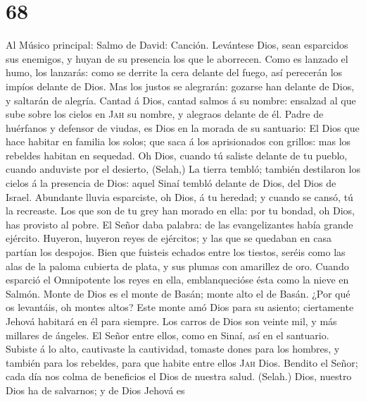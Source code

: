 \hypertarget{section-67}{%
\section{68}\label{section-67}}

 Al Músico principal: Salmo de David: Canción. Levántese
Dios, sean esparcidos sus enemigos, y huyan de su presencia los que le
aborrecen.  Como es lanzado el humo, los lanzarás: como se
derrite la cera delante del fuego, así perecerán los impíos delante de
Dios.  Mas los justos se alegrarán: gozarse han delante de
Dios, y saltarán de alegría.  Cantad á Dios, cantad salmos
á su nombre: ensalzad al que sube sobre los cielos en \textsc{Jah} su
nombre, y alegraos delante de él.  Padre de huérfanos y
defensor de viudas, es Dios en la morada de su santuario: 
El Dios que hace habitar en familia los solos; que saca á los
aprisionados con grillos: mas los rebeldes habitan en sequedad.
 Oh Dios, cuando tú saliste delante de tu pueblo, cuando
anduviste por el desierto, (Selah,)  La tierra tembló;
también destilaron los cielos á la presencia de Dios: aquel Sinaí tembló
delante de Dios, del Dios de Israel.  Abundante lluvia
esparciste, oh Dios, á tu heredad; y cuando se cansó, tú la recreaste.
 Los que son de tu grey han morado en ella: por tu
bondad, oh Dios, has provisto al pobre.  El Señor daba
palabra: de las evangelizantes había grande ejército. 
Huyeron, huyeron reyes de ejércitos; y las que se quedaban en casa
partían los despojos.  Bien que fuisteis echados entre
los tiestos, seréis como las alas de la paloma cubierta de plata, y sus
plumas con amarillez de oro.  Cuando esparció el
Omnipotente los reyes en ella, emblanquecióse ésta como la nieve en
Salmón.  Monte de Dios es el monte de Basán; monte alto
el de Basán.  ¿Por qué os levantáis, oh montes altos?
Este monte amó Dios para su asiento; ciertamente Jehová habitará en él
para siempre.  Los carros de Dios son veinte mil, y más
millares de ángeles. El Señor entre ellos, como en Sinaí, así en el
santuario.  Subiste á lo alto, cautivaste la cautividad,
tomaste dones para los hombres, y también para los rebeldes, para que
habite entre ellos \textsc{Jah} Dios.  Bendito el Señor;
cada día nos colma de beneficios el Dios de nuestra salud. (Selah.)
 Dios, nuestro Dios ha de salvarnos; y de Dios Jehová es
